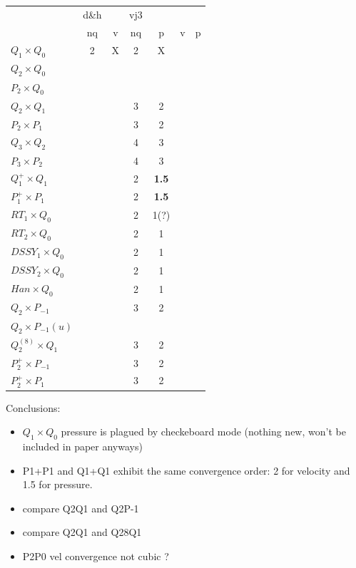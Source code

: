 \begin{center}
\begin{tabular}{l|ccc|ccc|}
\hline
                     & d\&h &   & vj3 & \\
                     & nq &v    & nq & p & v & p \\
\hline
\hline
$Q_1\times Q_0$       & 2    & X & 2 & X  \\%
$Q_2\times Q_0$       &     &  &  &       \\%
$P_2\times Q_0$       &     &  &  &       \\%
$Q_2\times Q_1$       &      &   & 3 & 2  \\%
$P_2\times P_1$       &      &   & 3 & 2  \\%
$Q_3\times Q_2$       &      &   & 4 & 3  \\%
$P_3\times P_2$       &      &   & 4 & 3  \\%
$Q_1^+\times Q_1$     &      &   & 2 & {\bf 1.5}  \\%
$P_1^+\times P_{1}$   &      &   & 2 & {\bf 1.5}  \\%
$RT_1\times Q_0$      &      &   & 2 & 1(?)\\%
$RT_2\times Q_0$      &      &   & 2 & 1   \\%
$DSSY_1\times Q_0$    &      &   & 2 & 1   \\%
$DSSY_2\times Q_0$    &      &   & 2 & 1   \\%
$Han\times Q_0$       &      &   & 2 & 1   \\%
$Q_2\times P_{-1}$    &      &   & 3 & 2   \\%
$Q_2\times P_{-1}(u)$ &      &   &  &      \\%
$Q_2^{(8)}\times Q_1$ &      &   & 3 & 2   \\%
$P_2^+\times P_{-1}$  &      &   & 3 & 2   \\%
$P_2^+\times P_{1}$   &      &   & 3 & 2   \\%
\hline
\end{tabular} 
\end{center}

\vspace{1cm}

Conclusions:
\begin{itemize}
\item $Q_1\times Q_0$ pressure is plagued by checkeboard mode (nothing new, won't be included in paper anyways)
\item P1+P1 and Q1+Q1 exhibit the same convergence order: 2 for velocity and 1.5 for pressure.
\item compare Q2Q1 and Q2P-1
\item compare Q2Q1 and Q28Q1
\item P2P0 vel convergence not cubic ?
\end{itemize}






